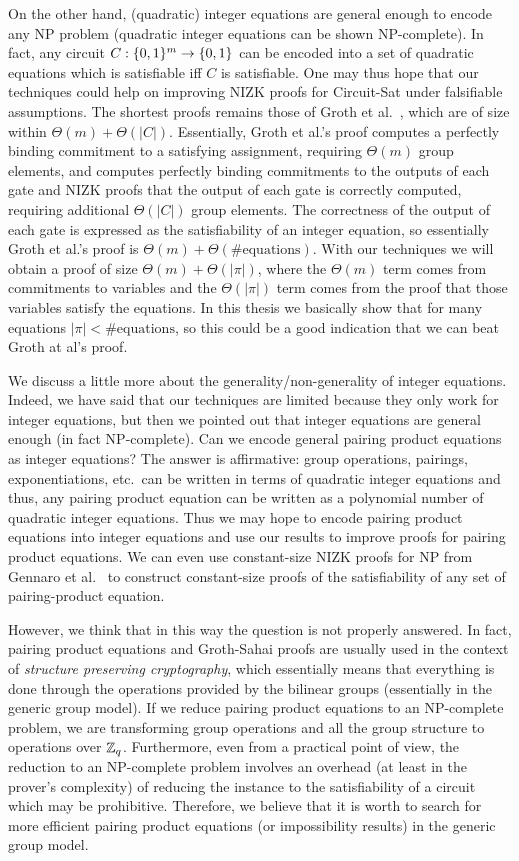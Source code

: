 On the other hand, (quadratic) integer equations are general enough to encode any NP problem (quadratic integer equations can be shown NP-complete). In fact, any circuit $C:\{0,1\}^m\to \{0,1\}$ can be encoded into a set of quadratic equations which is satisfiable iff $C$ is satisfiable.
One may thus hope that our techniques could help on improving NIZK proofs for Circuit-Sat under falsifiable assumptions. The shortest proofs remains those of Groth et al.~\cite{EC:GroOstSah06}, which are of size within $\Theta(m)+\Theta(|C|)$. Essentially, Groth et al.'s proof computes a perfectly binding commitment to a satisfying assignment, requiring $\Theta(m)$ group elements, and computes perfectly binding commitments to the outputs of each gate and NIZK proofs that the output of each gate is correctly computed, requiring additional $\Theta(|C|)$ group elements. The correctness of the output of each gate is expressed as the satisfiability of an integer equation, so essentially Groth et al.'s proof is $\Theta(m)+\Theta(\#\mathrm{equations})$.
With our techniques we will obtain a proof of size $\Theta(m)+\Theta(|\pi|)$, where the $\Theta(m)$ term comes from commitments to variables and the $\Theta(|\pi|)$ term comes from the proof that those variables satisfy the equations. In this thesis we basically show that for many equations $|\pi|< \#\mathrm{equations}$, so this could be a good indication that we can beat Groth at al's proof. 

We discuss a little more about the generality/non-generality of integer equations. Indeed, we have said that our techniques are limited because they only work for integer equations, but then we pointed out that integer equations are general enough (in fact NP-complete). Can we encode general pairing product equations as integer equations? The answer is affirmative: group operations, pairings, exponentiations, etc.~can be written in terms of quadratic integer equations and thus, any pairing product equation can be written as a polynomial number of quadratic integer equations. Thus we may hope to encode pairing product equations into integer equations and use our results to improve proofs for pairing product equations. We can even use constant-size NIZK proofs for NP from Gennaro et al.~\cite{EC:GGPR13} to construct constant-size proofs of the satisfiability of any set of pairing-product equation.

However, we think that in this way the question is not properly answered. In fact, pairing product equations and Groth-Sahai proofs are usually used in the context of \emph{structure preserving cryptography}, which essentially  means that everything is done through the operations provided by the bilinear groups (essentially in the generic group model). If we reduce pairing product equations to an NP-complete problem, we are transforming group operations and all the group structure to operations over $\mathbb{Z}_q$. Furthermore, even from a practical point of view, the reduction to an NP-complete problem involves an overhead (at least in the prover's complexity) of reducing the instance to the satisfiability of a circuit which may be prohibitive. Therefore, we believe that it is worth to search for more efficient pairing product equations (or impossibility results) in the generic group model.

